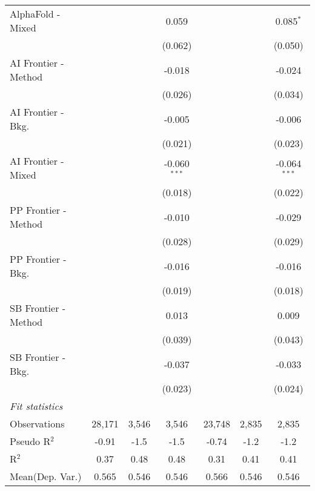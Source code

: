 \begin{tabular}{lcccccc}
   AlphaFold - Mixed    &                &               & 0.059          &                &         & 0.085$^{*}$\\   
                        &                &               & (0.062)        &                &         & (0.050)\\   
   AI Frontier - Method &                &               & -0.018         &                &         & -0.024\\   
                        &                &               & (0.026)        &                &         & (0.034)\\   
   AI Frontier - Bkg.   &                &               & -0.005         &                &         & -0.006\\   
                        &                &               & (0.021)        &                &         & (0.023)\\   
   AI Frontier - Mixed  &                &               & -0.060$^{***}$ &                &         & -0.064$^{***}$\\   
                        &                &               & (0.018)        &                &         & (0.022)\\   
   PP Frontier - Method &                &               & -0.010         &                &         & -0.029\\   
                        &                &               & (0.028)        &                &         & (0.029)\\   
   PP Frontier - Bkg.   &                &               & -0.016         &                &         & -0.016\\   
                        &                &               & (0.019)        &                &         & (0.018)\\   
   SB Frontier - Method &                &               & 0.013          &                &         & 0.009\\   
                        &                &               & (0.039)        &                &         & (0.043)\\   
   SB Frontier - Bkg.   &                &               & -0.037         &                &         & -0.033\\   
                        &                &               & (0.023)        &                &         & (0.024)\\   
   \midrule
   \emph{Fit statistics}\\
   Observations         & 28,171         & 3,546         & 3,546          & 23,748         & 2,835   & 2,835\\  
   Pseudo R$^2$         & -0.91          & -1.5          & -1.5           & -0.74          & -1.2    & -1.2\\  
   R$^2$                & 0.37           & 0.48          & 0.48           & 0.31           & 0.41    & 0.41\\  
Mean(Dep. Var.) & 0.565 & 0.546 & 0.546 & 0.566 & 0.546 & 0.546 \\
   

\end{tabular}
